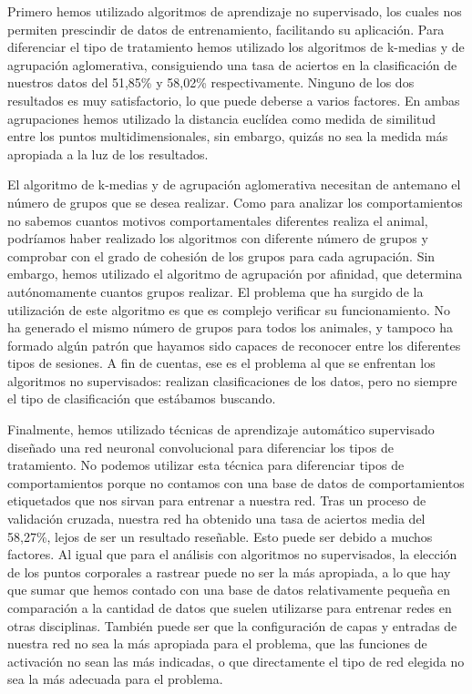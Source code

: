 Primero hemos utilizado algoritmos de aprendizaje no supervisado, los cuales  nos permiten prescindir de datos de entrenamiento, facilitando su aplicación. Para diferenciar el tipo de tratamiento hemos utilizado los algoritmos de k-medias y de agrupación aglomerativa, consiguiendo una tasa de aciertos en la clasificación de nuestros datos del 51,85\% y 58,02\% respectivamente. Ninguno de los dos resultados es muy satisfactorio, lo que puede deberse a varios factores. En ambas agrupaciones hemos utilizado la distancia euclídea como medida de similitud entre los puntos multidimensionales, sin embargo, quizás no sea la medida más apropiada a la luz de los resultados.

El algoritmo de k-medias y de agrupación aglomerativa necesitan de antemano el número de grupos que se desea realizar. Como para analizar los comportamientos no sabemos cuantos motivos comportamentales diferentes realiza el animal, podríamos haber realizado los algoritmos con diferente número de grupos y comprobar con el grado de cohesión de los grupos para cada agrupación. Sin embargo, hemos utilizado el algoritmo de agrupación por afinidad, que determina autónomamente cuantos grupos realizar. El problema que ha surgido de la utilización de este algoritmo es que es complejo verificar su funcionamiento. No ha generado el mismo número de grupos para todos los animales, y tampoco ha formado algún patrón que hayamos sido capaces de reconocer entre los diferentes tipos de sesiones. A fin de cuentas, ese es el problema al que se enfrentan los algoritmos no supervisados: realizan clasificaciones de los datos, pero no siempre el tipo de clasificación que estábamos buscando.

Finalmente, hemos utilizado técnicas de aprendizaje automático supervisado diseñado una red neuronal convolucional para diferenciar los tipos de tratamiento. No podemos utilizar esta técnica para diferenciar tipos de comportamientos porque no contamos con una base de datos de comportamientos etiquetados que nos sirvan para entrenar a nuestra red. Tras un proceso de validación cruzada, nuestra red ha obtenido una tasa de aciertos media del 58,27\%, lejos de ser un resultado reseñable. Esto puede ser debido a muchos factores. Al igual que para el análisis con algoritmos no supervisados, la elección de los puntos corporales a rastrear puede no ser la más apropiada, a lo que hay que sumar que hemos contado con una base de datos relativamente pequeña en comparación a la cantidad de datos que suelen utilizarse para entrenar redes en otras disciplinas. También puede ser que la configuración de capas y entradas de nuestra red no sea la más apropiada para el problema, que las funciones de activación no sean las más indicadas, o que directamente el tipo de red elegida no sea la más adecuada para el problema.

